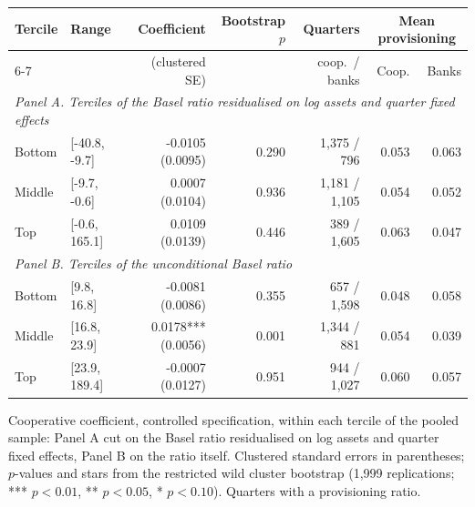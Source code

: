 \footnotesize
\setlength{\tabcolsep}{4pt}
\begin{tabular}{llrrrrr}
\toprule
Tercile & Range & Coefficient & Bootstrap $p$ & Quarters & \multicolumn{2}{c}{Mean provisioning} \\
\cmidrule(lr){6-7}
 & & (clustered SE) & & coop.\ / banks & Coop. & Banks \\
\midrule
\multicolumn{7}{l}{\textit{Panel A. Terciles of the Basel ratio residualised on log assets and quarter fixed effects}} \\
Bottom & [-40.8, -9.7] & -0.0105 (0.0095) & 0.290 & 1,375 / 796 & 0.053 & 0.063 \\
Middle & [-9.7, -0.6] & 0.0007 (0.0104) & 0.936 & 1,181 / 1,105 & 0.054 & 0.052 \\
Top & [-0.6, 165.1] & 0.0109 (0.0139) & 0.446 & 389 / 1,605 & 0.063 & 0.047 \\
\midrule
\multicolumn{7}{l}{\textit{Panel B. Terciles of the unconditional Basel ratio}} \\
Bottom & [9.8, 16.8] & -0.0081 (0.0086) & 0.355 & 657 / 1,598 & 0.048 & 0.058 \\
Middle & [16.8, 23.9] & 0.0178*** (0.0056) & 0.001 & 1,344 / 881 & 0.054 & 0.039 \\
Top & [23.9, 189.4] & -0.0007 (0.0127) & 0.951 & 944 / 1,027 & 0.060 & 0.057 \\
\bottomrule
\end{tabular}
\begin{tablenotes}[flushleft]\footnotesize
\item Cooperative coefficient, controlled specification, within each tercile of the pooled sample: Panel A cut on the Basel ratio residualised on log assets and quarter fixed effects, Panel B on the ratio itself. Clustered standard errors in parentheses; $p$-values and stars from the restricted wild cluster bootstrap (1,999 replications; *** $p<0.01$, ** $p<0.05$, * $p<0.10$). Quarters with a provisioning ratio.
\end{tablenotes}
